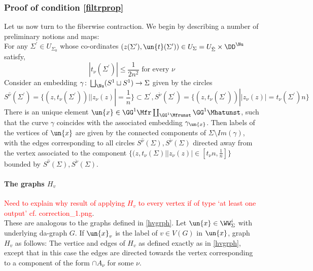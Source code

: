 \documentclass[a4paper,10pt]{amsart}
\begin{document}
\subsubsection{Proof of  condition \eqref{filtrprop}}\label{prfcondfiltrtop}
Let us now turn to the fiberwise contraction. We begin by describing a number of preliminary notions and maps:\\
For any $\Sigma^{\prime} \in U_{\Sigma_0}$ whose co-ordinates $(z(\Sigma^{\prime}),\un{t}(\Sigma^{\prime})) \in  U_{\Sigma} = U_{\hat{\Sigma}} \times \DD^{\Nu}$ satisfy,
\[ |t_\nu(\Sigma^{\prime})| \leq \frac{1}{2n^2} \mbox{ for every } \nu \]
Consider an embedding $\gamma \colon \bigsqcup_{\Nu} (S^1 \sqcup S^1) \to \Sigma$ given by the circles
\[ S^{\hat{\nu}}(\Sigma^{\prime}) = \{(z,t_{\nu}(\Sigma^{\prime})) | |z_{\nu}(z)| = \frac{1}{n} \} \subset \Sigma^{\prime}, S^{\check{\nu}}(\Sigma^{\prime}) = \{(z,t_{\nu}(\Sigma^{\prime})) | |z_{\nu}(z)| = t_{\nu}(\Sigma^{\prime}) n \} \]
There is an unique element $\un{x} \in \GG^1 \Mfr \coprod_{\GG^1  \Mfrunst} \GG^1 \Mhatunst$, such that the curve $\gamma$ coincides with the associated embedding $\gamma_{\un{x}}$. Then labels of the vertices of $\un{x}$ are given by the connected components of $\Sigma \setminus Im(\gamma)$, with the edges corresponding to all circles $S^{\hat{\nu}}(\Sigma), S^{\check{\nu}}(\Sigma)$ directed away from the vertex associated to the component $\{(z,t_{\nu}(\Sigma) |  |z_\nu(z)| \in [t_\nu n , \frac{1}{n}] \}$ bounded by $S^{\hat{\nu}}(\Sigma), S^{\check{\nu}}(\Sigma)$.\\
	\paragraph{\textbf{The graphs $H_v$}}\label{hvgrphbar}\textcolor{red}{Need to explain why result of applying $H_v$ to every vertex if of type `at least one output' cf. correction\_1.png}.\\
	These are analogous to the graphs defined in \ref{hvgrph}. Let $\un{x} \in \WW^{i}_{\Sigma}$ with underlying da-graph $G$. If $\un{x}_v$ is the label of $v \in V(G)$ in $\un{x}$, graph $H_v$ as follows: The vertice and edges of $H_v$ as defined exactly as in \ref{hvgrph}, except that in this case the edges are directed towards the vertex corresponding to a component of the form $\cap A_{\nu}$ for some $\nu$.
\end{document}
